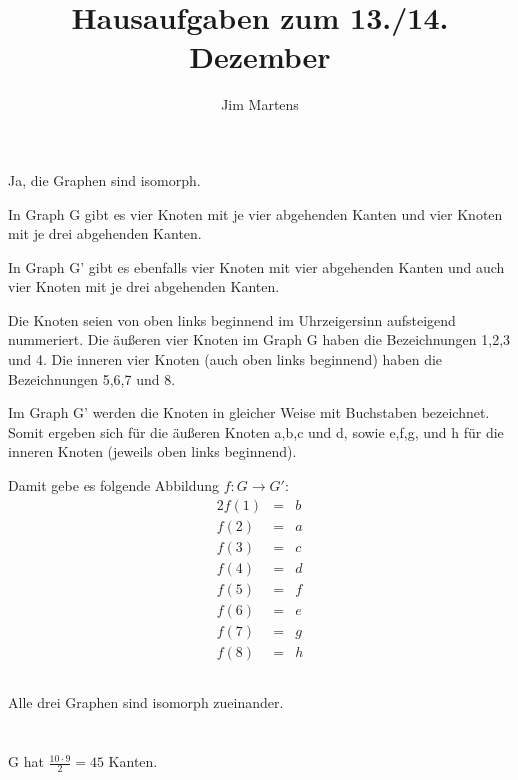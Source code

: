 \documentclass[10pt,a4paper,oneside,ngerman,numbers=noenddot]{scrartcl}
\begin{document}
\author{Jim Martens}
\title{Hausaufgaben zum 13./14. Dezember}
\maketitle
\section{} %
\subsection{} %
Ja, die Graphen sind isomorph.

In Graph G gibt es vier Knoten mit je vier abgehenden Kanten und vier Knoten mit je drei abgehenden Kanten.

In Graph G' gibt es ebenfalls vier Knoten mit vier abgehenden Kanten und auch vier Knoten mit je drei abgehenden Kanten.

Die Knoten seien von oben links beginnend im Uhrzeigersinn aufsteigend nummeriert. Die äußeren vier Knoten im Graph G haben die Bezeichnungen 1,2,3 und 4. Die inneren vier Knoten (auch oben links beginnend) haben die Bezeichnungen 5,6,7 und 8.

Im Graph G' werden die Knoten in gleicher Weise mit Buchstaben bezeichnet. Somit ergeben sich für die äußeren Knoten a,b,c und d, sowie e,f,g, und h für die inneren Knoten (jeweils oben links beginnend).

Damit gebe es folgende Abbildung $f: G \rightarrow G'$:\\

\begin{alignat*}{2}
f(1) &=& b \\
f(2) &=& a \\
f(3) &=& c \\
f(4) &=& d \\
f(5) &=& f \\
f(6) &=& e \\
f(7) &=& g \\
f(8) &=& h
\end{alignat*}
\subsection{} %
Alle drei Graphen sind isomorph zueinander.

\section{} %
\subsection{} %
G hat $\frac{10 \cdot 9}{2} = 45$ Kanten.
\end{document}
